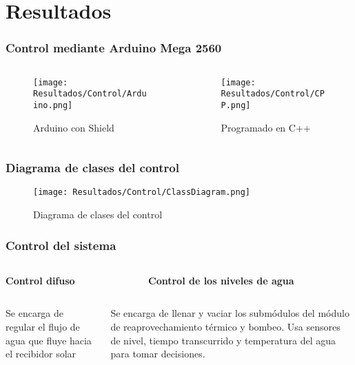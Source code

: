 \section{Resultados}
\begin{frame}
	\frametitle{Control mediante Arduino Mega 2560}
	\begin{columns}
		\begin{column}{0.5\linewidth}
			\begin{figure}
				\centering
				\texttt{[image: Resultados/Control/Arduino.png]}
				\caption{Arduino con Shield}
			\end{figure}
		\end{column}
		\begin{column}{0.5\linewidth}
			\begin{figure}
				\centering
				\texttt{[image: Resultados/Control/CPP.png]}
				\caption{Programado en C++}
			\end{figure}
		\end{column}
	\end{columns}
		
\end{frame}

\begin{frame}
	\frametitle{Diagrama de clases del control}
	
	\begin{figure}
		\centering
		\texttt{[image: Resultados/Control/ClassDiagram.png]}
		\caption{Diagrama de clases del control}
	\end{figure}
\end{frame}

\begin{frame}
	\frametitle{Control del sistema}
	\begin{columns}
		\begin{column}{0.5\linewidth}
			\textbf{Control difuso}
		\end{column}
		\begin{column}{0.5\linewidth}
			\textbf{Control de los niveles de agua}
		\end{column}
	\end{columns}
	
	\begin{columns}
		\begin{column}{0.5\linewidth}
			Se encarga de regular el flujo de agua que fluye hacia el recibidor solar
		\end{column}
		\begin{column}{0.5\linewidth}
			Se encarga de llenar y vaciar los submódulos del módulo de reaprovechamiento térmico y bombeo. Usa sensores de nivel, tiempo transcurrido y temperatura del agua para tomar decisiones.
		\end{column}
	\end{columns}
		
\end{frame}